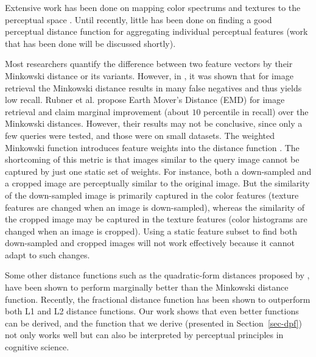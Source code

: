 Extensive work has been done on mapping color spectrums and textures to
the perceptual space \cite{B99,MWNS01,TMY78,W95,Jiawei98}.  Until
recently, little has been done on finding a good perceptual distance
function for aggregating individual perceptual features (work that has
been done will be discussed shortly).

Most researchers quantify the difference between two feature vectors by
their Minkowski distance or its variants.  However, in
\cite{Stricker95}, it was shown that for image retrieval the Minkowski
distance results in many false negatives and thus yields low recall.
Rubner et al. \cite{Rtg98} propose Earth Mover's Distance (EMD) for
image retrieval and claim marginal improvement (about $10$ percentile
in recall) over the Minkowski distances. However, their results may not
be conclusive, since only a few queries were tested, and those were on
small datasets.  The weighted Minkowski function introduces feature
weights into the distance function \cite{PMO99,RH00}. The shortcoming
of this metric is that images similar to the query image cannot be
captured by just one static set of weights.  For instance, both a
down-sampled and a cropped image are perceptually similar to the
original image.  But the similarity of the down-sampled image is
primarily captured in the color features (texture features are changed
when an image is down-sampled), whereas the similarity of the cropped
image may be captured in the texture features (color histograms are
changed when an image is cropped).  Using a static feature subset to
find both down-sampled and cropped images will not work effectively
because it cannot adapt to such changes.

Some other distance functions such as the quadratic-form distances
proposed by \cite{img11, ISF98}, have been shown to perform marginally
better than the Minkowski distance function.  Recently, the fractional
distance function \cite{Agg-ICDT01} has been shown to outperform both
L1 and L2 distance functions.  Our work shows that even better
functions can be derived, and the function that we derive (presented in
Section~\ref{sec-dpf}) not only works well but can also be interpreted
by perceptual principles in cognitive science.

